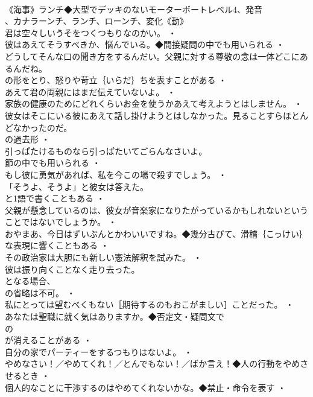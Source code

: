 \documentclass[8pt]{extreport}
\begin{document}
\begin{CJK}{UTF8}{min}
\\	《海事》ランチ◆大型でデッキのないモーターボートレベル4、発音
\\	、カナラーンチ、ランチ、ローンチ、変化《動》
\\	君は空々しいうそをつくつもりなのかい。 ・
\\	彼はあえてそうすべきか、悩んでいる。◆間接疑問の中でも用いられる ・
\\	どうしてそんな口の聞き方をするんだい。父親に対する尊敬の念は一体どこにあるんだね。
\\	の形をとり、怒りや苛立｛いらだ｝ちを表すことがある ・
\\	あえて君の両親にはまだ伝えていないよ。 ・
\\	家族の健康のためにどれくらいお金を使うかあえて考えようとはしません。 ・
\\	彼女はそこにいる彼にあえて話し掛けようとはしなかった。見ることすらほとんどなかったのだ。
\\	の過去形 ・
\\	引っぱたけるものなら引っぱたいてごらんなさいよ。
\\	節の中でも用いられる ・
\\	もし彼に勇気があれば、私を今この場で殺すでしょう。 ・
\\	「そうよ、そうよ」と彼女は答えた。
\\	と1語で書くこともある ・
\\	父親が懸念しているのは、彼女が音楽家になりたがっているかもしれないということではないでしょうか。 ・
\\	おやまあ、今日はずいぶんとかわいいですね。◆幾分古びて、滑稽｛こっけい｝な表現に響くこともある ・
\\	その政治家は大胆にも新しい憲法解釈を試みた。 ・
\\	彼は振り向くことなく走り去った。
\\	となる場合、
\\	の省略は不可。 ・
\\	私にとっては望むべくもない［期待するのもおこがましい］ことだった。 ・
\\	あなたは聖職に就く気はありますか。◆否定文・疑問文で
\\	の
\\	が消えることがある ・
\\	自分の家でパーティーをするつもりはないよ。 ・
\\	やめなさい！／やめてくれ！／とんでもない！／ばか言え！◆人の行動をやめさせるとき ・
\\	個人的なことに干渉するのはやめてくれないかな。◆禁止・命令を表す ・

\end{CJK}
\end{document}
